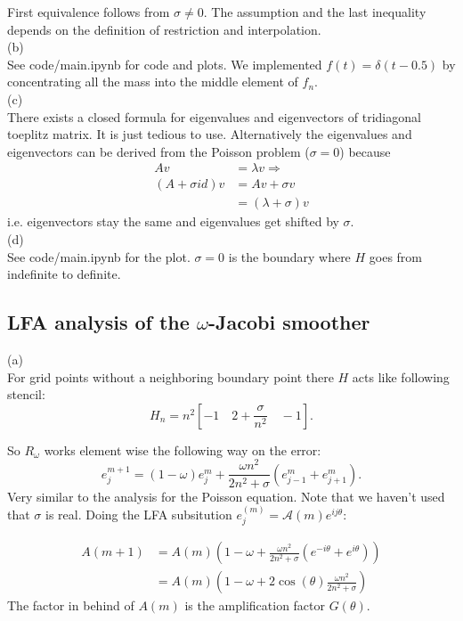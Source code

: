 \documentclass[a4paper,12pt]{article}
\begin{document}
First equivalence follows from $\sigma \neq 0$. The assumption and the last inequality depends on the definition of
restriction and interpolation. \\
(b) \\
See code/main.ipynb for code and plots. We implemented $f(t) = \delta(t-0.5)$ by concentrating all the mass into the
middle element of $f_n$.\\
(c) \\
There exists a closed formula for eigenvalues and eigenvectors of tridiagonal toeplitz matrix. It is just tedious to
use. Alternatively the eigenvalues and eigenvectors can be derived from the Poisson problem ($\sigma=0$) because
\begin{align*}
    Av             & = \lambda v \Rightarrow \\
    (A+\sigma id)v & = Av + \sigma v         \\
                   & = (\lambda+\sigma)v
\end{align*}
i.e. eigenvectors stay the same and eigenvalues get shifted by $\sigma$. \\

(d) \\
See code/main.ipynb for the plot. $\sigma = 0$ is the boundary where $H$ goes from indefinite to definite.

\subsection{LFA analysis of the $\omega$-Jacobi smoother}
(a) \\
For grid points without a neighboring boundary point there
$H$ acts like following stencil:
\[
    H_n = n^{2} [ -1 \quad 2+ \frac{\sigma}{n^{2}}  \quad -1]
    .\]

So $R_{\omega}$ works element wise the following way on the error:
\begin{equation}
    e_{j}^{m+1} = (1-\omega) e_{j} ^{m} + \frac{\omega n^{2}}{2 n^{2} + \sigma} (e_{j-1} ^{m} + e_{j+1}^{m})
    .
\end{equation}
Very similar to the analysis for the Poisson equation. Note that we haven't used that $\sigma$ is real.
Doing the LFA subsitution $e_j^{(m)}=\mathcal{A}(m) e^{i j \theta}$:

\begin{align*}
    A(m+1) & = A(m) \left( 1-\omega + \frac{\omega n^{2}}{2 n^{2} + \sigma} (e^{-i\theta} + e^{i\theta}) \right) \\
           & = A(m) \left( 1-\omega + 2 \cos(\theta) \frac{\omega n^{2}}{2 n^{2} + \sigma}   \right)
\end{align*}
The factor in behind of $A(m)$ is the amplification factor $G(\theta)$.
\end{document}
